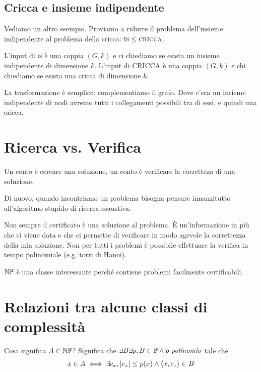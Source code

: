 \subsection{Cricca e insieme indipendente}

Vediamo un altro esempio. Proviamo a ridurre il problema dell'insieme indipendente al problema della
cricca: $\textsc{is} \leq \textsc{cricca}$.

L'input di \textsc{is} è una coppia $(G,k)$ e ci chiediamo se esista un insieme indipendente di
dimensione $k$. L'input di CRICCA è una coppia $(G,k)$ e chi chiediamo se esista una cricca di
dimensione $k$.

La trasformazione è semplice: complementiamo il grafo. Dove c'era un insieme indipendente di nodi
avremo tutti i collegamenti possibili tra di essi, e quindi una cricca.

\section{Ricerca vs. Verifica}


Un conto è cercare una soluzione, un conto è verificare la corretteza di una soluzione.

Di nuovo, quando incontriamo un problema bisogna pensare innanzitutto all'algoritmo stupido di
ricerca esaustiva.


Non sempre il certificato è una soluzione al problema. È un'informazione in più che ci viene data
e che ci permette di verificare in modo agevole la correttezza della mia soluzione. Non per tutti i
problemi è possibile effettuare la verifica in tempo polinomiale (e.g. torri di Hanoi).

$\mathbb{NP}$ è una classe interessante perché contiene problemi facilmente certificabili.

\section{Relazioni tra alcune classi di complessità}

Cosa significa $A \in \mathbb{NP}$? Significa che $\exists B \exists p, B \in \mathbb{P} \land p\textit{ polinomio}$
tale che
\begin{equation*}
    x \in A \iff \exists c_{x}, |c_{x}| \leq p(x) \land \langle x, c_{x} \rangle \in B
\end{equation*}

